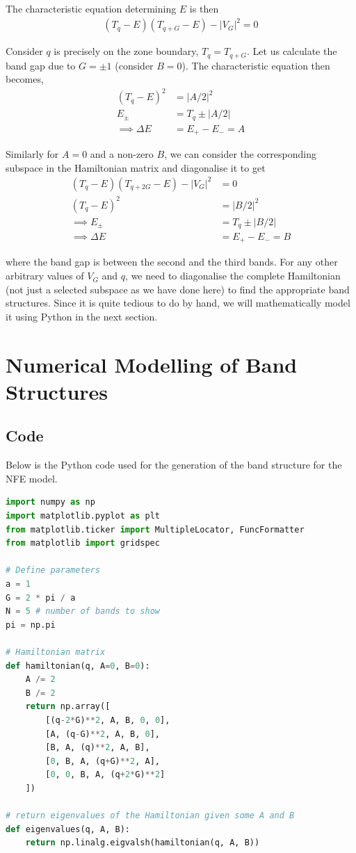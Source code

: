\documentclass[12pt,a4paper]{article}
\begin{document}
The characteristic equation determining $E$ is then
\begin{align*}
    \left(T_q - E\right)\left(T_{q+G}-E\right) - |V_G|^2 = 0
\end{align*}

Consider $q$ is precisely on the zone boundary, $T_q = T_{q+G}$. Let us calculate the band gap due to $G=\pm 1$ (consider $B=0$). The characteristic equation then becomes,
\begin{align*}
    \left(T_q - E\right)^2 &= |A/2|^2 \\
    E_{\pm} &= T_q \pm |A/2|\\
    \implies \Delta E &= E_{+} - E_{-} = A
\end{align*}

Similarly for $A=0$ and a non-zero $B$, we can consider the corresponding subspace in the Hamiltonian matrix and diagonalise it to get
\begin{align*}
    \left(T_q - E\right) \left(T_{q+2G}-E \right) - |V_G|^2 &= 0\\
    \left(T_q - E\right) ^2 &= |B/2|^2 \\
    \implies E_{\pm} &= T_q \pm |B/2|\\
    \implies \Delta E &= E_{+} - E_{-} = B
\end{align*}

where the band gap is between the second and the third bands. For any other arbitrary values of $V_G$ and $q$, we need to diagonalise the complete Hamiltonian (not just a selected subspace as we have done here) to find the appropriate band structures. Since it is quite tedious to do by hand, we will mathematically model it using Python in the next section.

\section{Numerical Modelling of Band Structures}

\subsection{Code}

Below is the Python code used for the generation of the band structure for the NFE model.

\begin{lstlisting}[language=Python, caption=Defining Parameters and the Hamiltonian]
import numpy as np
import matplotlib.pyplot as plt
from matplotlib.ticker import MultipleLocator, FuncFormatter
from matplotlib import gridspec

# Define parameters
a = 1
G = 2 * pi / a
N = 5 # number of bands to show
pi = np.pi

# Hamiltonian matrix
def hamiltonian(q, A=0, B=0):
    A /= 2
    B /= 2
    return np.array([
        [(q-2*G)**2, A, B, 0, 0],
        [A, (q-G)**2, A, B, 0],
        [B, A, (q)**2, A, B],
        [0, B, A, (q+G)**2, A],
        [0, 0, B, A, (q+2*G)**2]
    ])

# return eigenvalues of the Hamiltonian given some A and B
def eigenvalues(q, A, B):
    return np.linalg.eigvalsh(hamiltonian(q, A, B))
\end{lstlisting}
\end{document}
